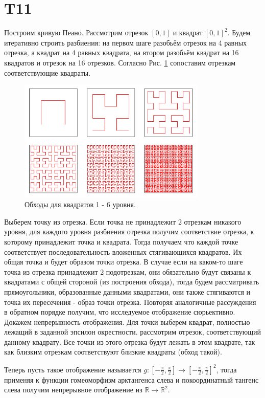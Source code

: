 \documentclass[12pt]{article}
\begin{document}
\section{T11}
Построим кривую Пеано. Рассмотрим отрезок \([0, 1]\) и квадрат \([0, 1]^{2} \). 
Будем итеративно строить разбиения: на первом шаге разобьём отрезок на 4 равных отрезка, а квадрат
на 4 равных квадрата, на втором разобьём квадрат на 16 квадратов и отрезок на 16 отрезков. Согласно
Рис. \ref{fig:T11} сопоставим отрезкам соответствующие квадраты. 
\begin{figure}[H]
    \centering
    \includegraphics[width=0.8\textwidth]{figures/Hilbert_curve.png}
    \caption{Обходы для квадратов 1 - 6 уровня.}
    \label{fig:T11}
\end{figure}
Выберем точку из отрезка. Если точка не принадлежит 2 отрезкам никакого уровня, для каждого 
уровня разбиения отрезка получим соответствие отрезка, к которому принадлежит точка и квадрата. 
Тогда получаем что каждой точке соответствует последовательность вложенных стягивающихся квадратов. 
Их общая точка и будет образом точки отрезка. 
В случае если на каком-то шаге точка из отрезка принадлежит 2 подотрезкам, они обязательно будут 
связаны к квадратами с общей стороной (из построения обхода), тогда будем рассматривать прямоугольники,
образованные данными квадратами, они также стягиваются и точка их пересечения - образ точки отрезка.
Повторяя аналогичные рассуждения в обратном порядке получим, что исследуемое отображение сюрьективно.
Докажем непрерывность отображения. Для точки выберем квадрат, полностью лежащий в заданной эпсилон окрестности. 
рассмотрим отрезок, соответствующий данному квадрату. Все точки из этого отрезка будут лежать в этом квадрате, так как 
близким отрезкам соответствуют близкие квадраты (обход такой).

Теперь пусть такое отображение называется $g: [-\frac{\pi}{2}, \frac{\pi}{2}] \to [-\frac{\pi}{2}, \frac{\pi}{2}]^2$, тогда 
применяя к функции гомеоморфизм арктангенса слева и покоординатный тангенс слева получим непрерывное отображение 
из $\mathbb{R} \to \mathbb{R}^2$.
\end{document}
